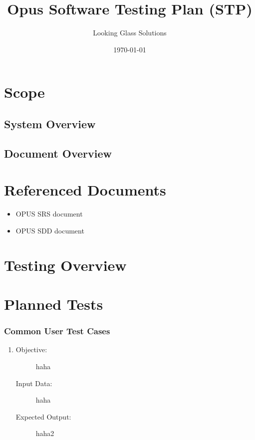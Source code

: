 \documentclass[a4, 11pt]{article}
\title{Opus Software Testing Plan (STP)}
\author{Looking Glass Solutions}
\date{\today}
\begin{document}
\maketitle
\tableofcontents
\newpage

\section{Scope}
\subsection{System Overview}
\subsection{Document Overview}

\section{Referenced Documents}
\begin{itemize}
	\item OPUS SRS document
	\item OPUS SDD document
\end{itemize}

\section{Testing Overview}
\section{Planned Tests}
\subsubsection{Common User Test Cases}
\begin{enumerate}
	\item
		\begin{description}
			\item[Objective:] haha
			\item[Input Data:] haha
			\item[Expected Output:] haha2
		\end{description}
\end{enumerate}
\end{document}
